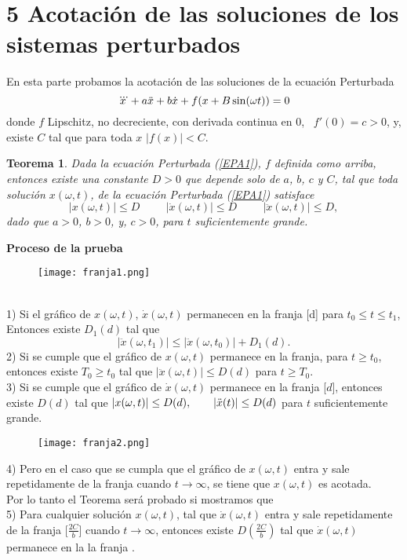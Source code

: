 \documentclass[letter]{article}
\newtheorem{theo}{Teorema}
\begin{document}
\section{5 Acotaci{\'o}n de las soluciones de los sistemas perturbados}
  En
esta parte probamos la acotaci{\'o}n de las soluciones de la ecuaci{\'o}n
Perturbada
\begin{equation}{\label{EPA1}}
\dddot{x}+a\ddot{x}+b\dot{x}+f(x+B\sin(\omega t))=0
\end{equation}
donde  $f$  Lipschitz, no decreciente,  con derivada continua en
0, \, $f'(0)=c>0$, y, existe $C$ tal que para toda $x$ \quad
$|f(x)|<C$.
\begin{theo}\label{epert} Dada la ecuaci{\'o}n Perturbada (\ref{EPA1}), $f$
definida como arriba, entonces existe una constante $D>0$  que
depende solo de $a$, $b$, $c$ y $C$, tal que toda soluci{\'o}n
$x(\omega,t)$, de la ecuaci{\'o}n Perturbada (\ref{EPA1}) satisface
$$|x(\omega,t)|\leq D\hspace{1cm}|\dot{x}(\omega,t)|\leq
D\hspace{1cm}|\ddot{x}(\omega,t)|\leq D,$$ dado que  $a>0$, $b>0$,
y,  $c>0$, para $t$ suficientemente grande.
\end{theo}
\newpage
{\bf\Large{Proceso de la prueba }}
\begin{figure}[h]
\centering
\texttt{[image: franja1.png]}
\caption{} \label{F1}
\end{figure}
\\
1) Si el gr{\'a}fico de  $x(\omega,t)$, $\dot{x}(\omega,t)$ permanecen
en la franja [d] para $t_0\leq t\leq t_1$, Entonces existe
$D_1(d)$ tal que
\begin{equation}\label{Ae11}
|\ddot{x}(\omega,t_1)|\leq |\ddot{x}(\omega,t_0)|+D_1(d).
\end{equation}
2) Si se cumple que el gr{\'a}fico de  $x(\omega,t)$ permanece en la
franja, para  $t\geq t_0$, entonces existe $T_0\geq t_0$ tal que
$|\ddot{x}(\omega,t)|\leq D(d)$ para  $t\geq T_0$.
\\
3) Si se cumple que el gr{\'a}fico de $\dot{x}(\omega,t)$ permanece en
la franja [$d$], entonces existe $D(d)$ tal que $|x(\omega,t)|\leq
D(d), \hspace{0.7 cm}|\ddot{x}(t)|\leq D(d)$ para  $t$
suficientemente grande.
\\
\begin{figure}[h]
\centering
\texttt{[image: franja2.png]}
\caption{ } \label{F1}
\end{figure}
4) Pero en el caso que se cumpla que el gr{\'a}fico de $x(\omega,t)$
entra y sale repetidamente de la franja cuando
$t\rightarrow\infty$, se tiene que $x(\omega,t)$ es acotada.
\\
Por lo tanto el Teorema ser{\'a} probado si mostramos que
\\
5) Para cualquier soluci{\'o}n $x(\omega,t)$, tal que
$\dot{x}(\omega,t)$ entra y sale repetidamente de la franja
[$\displaystyle{\frac{2C}{b}}$] cuando $t\rightarrow\infty$,
entonces existe $D(\displaystyle{\frac{2C}{b}})$ tal que
$\dot{x}(\omega,t)$ permanece en la la franja
. 
\end{document}
